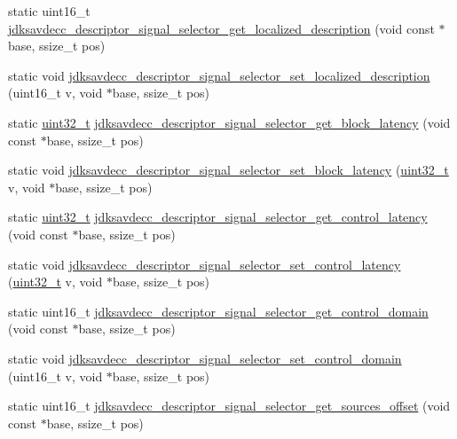 \begin{DoxyCompactItemize}
\item 
static uint16\+\_\+t \hyperlink{group__descriptor__signal__selector_gaf2e3b7274586611438c6e116f6388435}{jdksavdecc\+\_\+descriptor\+\_\+signal\+\_\+selector\+\_\+get\+\_\+localized\+\_\+description} (void const $\ast$base, ssize\+\_\+t pos)
\item 
static void \hyperlink{group__descriptor__signal__selector_gaabaa06961aea7af702f8e7a8f4430390}{jdksavdecc\+\_\+descriptor\+\_\+signal\+\_\+selector\+\_\+set\+\_\+localized\+\_\+description} (uint16\+\_\+t v, void $\ast$base, ssize\+\_\+t pos)
\item 
static \hyperlink{parse_8c_a6eb1e68cc391dd753bc8ce896dbb8315}{uint32\+\_\+t} \hyperlink{group__descriptor__signal__selector_gad4ea4e29c79525f445ada05031987143}{jdksavdecc\+\_\+descriptor\+\_\+signal\+\_\+selector\+\_\+get\+\_\+block\+\_\+latency} (void const $\ast$base, ssize\+\_\+t pos)
\item 
static void \hyperlink{group__descriptor__signal__selector_ga14a423ff793bff3ff5960aa14a7b3d77}{jdksavdecc\+\_\+descriptor\+\_\+signal\+\_\+selector\+\_\+set\+\_\+block\+\_\+latency} (\hyperlink{parse_8c_a6eb1e68cc391dd753bc8ce896dbb8315}{uint32\+\_\+t} v, void $\ast$base, ssize\+\_\+t pos)
\item 
static \hyperlink{parse_8c_a6eb1e68cc391dd753bc8ce896dbb8315}{uint32\+\_\+t} \hyperlink{group__descriptor__signal__selector_ga991d1e1e2b1cac5b71080b8206250f66}{jdksavdecc\+\_\+descriptor\+\_\+signal\+\_\+selector\+\_\+get\+\_\+control\+\_\+latency} (void const $\ast$base, ssize\+\_\+t pos)
\item 
static void \hyperlink{group__descriptor__signal__selector_gabf0f93f39cc9d1ae4a89a556d0155e1f}{jdksavdecc\+\_\+descriptor\+\_\+signal\+\_\+selector\+\_\+set\+\_\+control\+\_\+latency} (\hyperlink{parse_8c_a6eb1e68cc391dd753bc8ce896dbb8315}{uint32\+\_\+t} v, void $\ast$base, ssize\+\_\+t pos)
\item 
static uint16\+\_\+t \hyperlink{group__descriptor__signal__selector_gacdc895fafbd728e73d57da62b3ae47e6}{jdksavdecc\+\_\+descriptor\+\_\+signal\+\_\+selector\+\_\+get\+\_\+control\+\_\+domain} (void const $\ast$base, ssize\+\_\+t pos)
\item 
static void \hyperlink{group__descriptor__signal__selector_gaf0f01f648cd33b473f499ffbba32561d}{jdksavdecc\+\_\+descriptor\+\_\+signal\+\_\+selector\+\_\+set\+\_\+control\+\_\+domain} (uint16\+\_\+t v, void $\ast$base, ssize\+\_\+t pos)
\item 
static uint16\+\_\+t \hyperlink{group__descriptor__signal__selector_gaad1dd192714ec97fa014cc58d9daa751}{jdksavdecc\+\_\+descriptor\+\_\+signal\+\_\+selector\+\_\+get\+\_\+sources\+\_\+offset} (void const $\ast$base, ssize\+\_\+t pos)

\end{DoxyCompactItemize}

